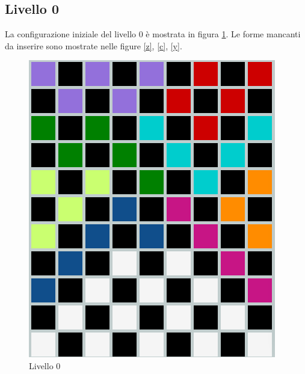 \subsection{Livello 0}
La configurazione iniziale del livello 0 è mostrata in figura \ref{lev0}. Le forme mancanti da inserire sono mostrate nelle figure \ref{z}, \ref{c}, \ref{y}.
\begin{figure}[h]
	\centering
	\includegraphics[scale=0.3]{immagini/lv0}
	\caption{Livello 0}
	\label{lev0}
\end{figure}
\\
\noindent



